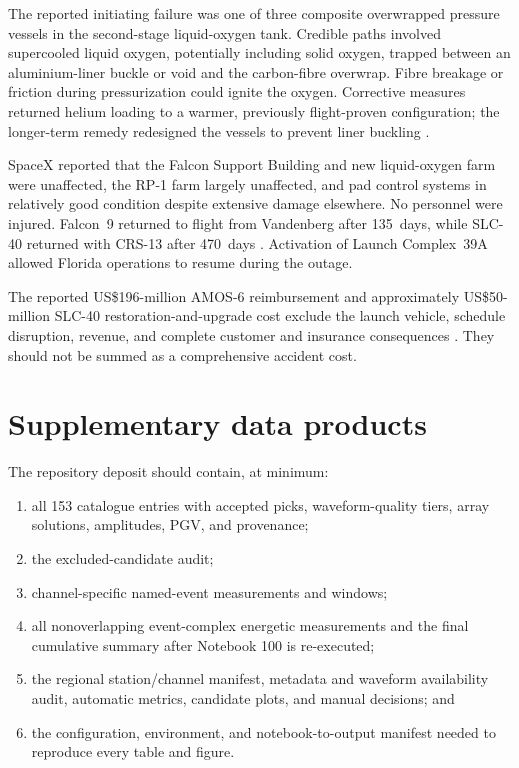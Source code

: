 \documentclass[]{seismica}
\begin{document}
The reported initiating failure was one of three composite overwrapped pressure
vessels in the second-stage liquid-oxygen tank. Credible paths involved
supercooled liquid oxygen, potentially including solid oxygen, trapped between
an aluminium-liner buckle or void and the carbon-fibre overwrap. Fibre breakage
or friction during pressurization could ignite the oxygen. Corrective measures
returned helium loading to a warmer, previously flight-proven configuration;
the longer-term remedy redesigned the vessels to prevent liner buckling
\citep{spacex_anomaly_2017}.

SpaceX reported that the Falcon Support Building and new liquid-oxygen farm
were unaffected, the RP-1 farm largely unaffected, and pad control systems in
relatively good condition despite extensive damage elsewhere. No personnel
were injured. Falcon~9 returned to flight from Vandenberg after 135~days, while
SLC-40 returned with CRS-13 after 470~days
\citep{spacex_iridium1_2017,spacex_crs13_2017}. Activation of Launch
Complex~39A allowed Florida operations to resume during the outage.

The reported US\$196-million AMOS-6 reimbursement and approximately
US\$50-million SLC-40 restoration-and-upgrade cost exclude the launch vehicle,
schedule disruption, revenue, and complete customer and insurance consequences
\citep{magan_amos6_2016,clark_slc40_2017}. They should not be summed as a
comprehensive accident cost.

\section{Supplementary data products}

The repository deposit should contain, at minimum:
\begin{enumerate}
  \item all 153 catalogue entries with accepted picks, waveform-quality tiers,
        array solutions, amplitudes, PGV, and provenance;
  \item the excluded-candidate audit;
  \item channel-specific named-event measurements and windows;
  \item all nonoverlapping event-complex energetic measurements and the final
        cumulative summary after Notebook 100 is re-executed;
  \item the regional station/channel manifest, metadata and waveform
        availability audit, automatic metrics, candidate plots, and manual
        decisions; and
  \item the configuration, environment, and notebook-to-output manifest needed
        to reproduce every table and figure.
\end{enumerate}


\end{document}
